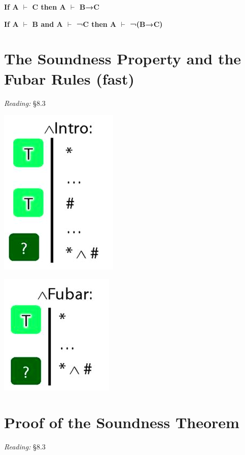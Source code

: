 \documentclass[12pt]{extarticle}
\begin{document}
\begin{multicols*}{3}
\textbf{If A $\vdash$ C then A $\vdash$ B→C}
 
\textbf{If A $\vdash$ B and A $\vdash$ ¬C then A $\vdash$ ¬(B→C)}
 
 
 
\section{The Soundness Property and the Fubar Rules (fast)}
 
\emph{Reading:} §8.3
 
\begin{center}
\includegraphics[scale=0.3]{img/unit_346_and.png}
\end{center}
\begin{center}
\includegraphics[scale=0.3]{img/unit_346_fubar.png}
\end{center}
 
 
\section{Proof of the Soundness Theorem}
 
\emph{Reading:} §8.3
 
\begin{minipage}{\columnwidth}
 

\end{minipage}
\end{multicols*}
\end{document}
